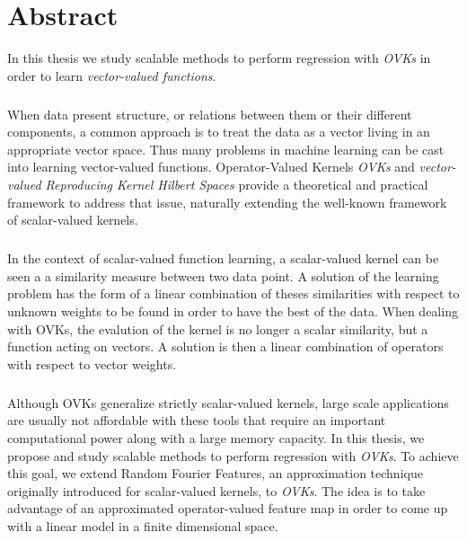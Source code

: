 



\begingroup
\let\clearpage\relax
\let\cleardoublepage\relax
\let\cleardoublepage\relax

\chapter*{Abstract}
In this thesis we study scalable methods to perform regression with \emph{\acl{OVK}s} in order to learn \emph{vector-valued functions}.
\paragraph{}
When data present structure, or relations between them or their different components, a common approach is to treat the data as a vector living in an appropriate vector space. Thus many problems in machine learning can be cast into learning vector-valued functions. Operator-Valued Kernels \emph{\acl{OVK}s} and \emph{vector-valued Reproducing Kernel Hilbert Spaces} provide a theoretical and practical framework to address that issue, naturally extending the well-known framework of scalar-valued kernels.
\paragraph{}
In the context of scalar-valued function learning, a scalar-valued kernel can be seen a a similarity measure between two data point. A solution of the learning problem has the form of a linear combination of theses similarities with respect to unknown weights to be found in order to have the best  of the data. When dealing with \acl{OVK}s, the evalution of the kernel is no longer a scalar similarity, but a function acting on vectors. A solution is then a linear combination of operators with respect to vector weights.
\paragraph{}
Although \acl{OVK}s generalize strictly scalar-valued kernels, large scale applications are usually not affordable with these tools that require an important computational power along with a large memory capacity. In this thesis, we propose and study scalable methods to perform regression with \emph{\acl{OVK}s}. To achieve this goal, we extend Random Fourier Features, an approximation technique originally introduced for scalar-valued kernels, to \emph{\acl{OVK}s}. The idea is to take advantage of an approximated operator-valued feature map in order to come up with a linear model in a finite dimensional space.

